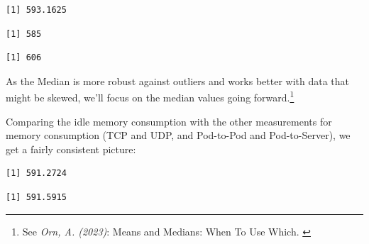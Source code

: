 \begin{verbatim}
[1] 593.1625
\end{verbatim}

\begin{Shaded}
\begin{Highlighting}[]
\SpecialCharTok{\$}
\end{Highlighting}
\end{Shaded}

\begin{verbatim}
[1] 585
\end{verbatim}

\begin{Shaded}
\begin{Highlighting}[]
\SpecialCharTok{\$}
\end{Highlighting}
\end{Shaded}

\begin{verbatim}
[1] 606
\end{verbatim}

As the Median is more robust against outliers and works better with data that might be skewed, we'll focus on the median values going forward.\footnote{See \textit{Orn, A. (2023)}: Means and Medians: When To Use Which. \cite{meansMedians}}

Comparing the idle memory consumption with the other measurements for memory consumption (TCP and UDP, and Pod-to-Pod and Pod-to-Server), we get a fairly consistent picture:

\begin{Shaded}
\begin{Highlighting}[]
\SpecialCharTok{\$}
\end{Highlighting}
\end{Shaded}

\begin{verbatim}
[1] 591.2724
\end{verbatim}

\begin{Shaded}
\begin{Highlighting}[]
\SpecialCharTok{\$}
\end{Highlighting}
\end{Shaded}

\begin{verbatim}
[1] 591.5915
\end{verbatim}

